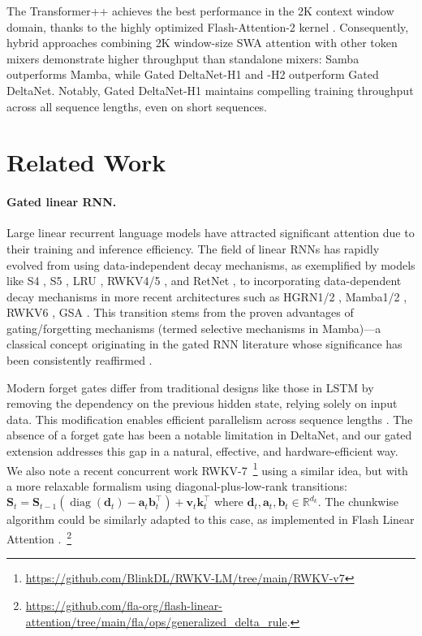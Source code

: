 \documentclass{article}
\def\rmS{{\mathbf{S}}}
\def\vk{{\bm{k}}}
\def\vv{{\bm{v}}}
\begin{document}
The Transformer++ achieves the best performance in the 2K context window domain, thanks to the highly optimized Flash-Attention-2 kernel \citep{flashattention2}. Consequently, hybrid approaches combining 2K window-size SWA attention with other token mixers demonstrate higher throughput than standalone mixers: Samba  outperforms Mamba, while Gated DeltaNet-H1 and -H2 
 outperform Gated DeltaNet. Notably, Gated DeltaNet-H1 maintains compelling training throughput across all sequence lengths, even on short sequences.

\section{Related Work} 
\paragraph{Gated linear RNN.} Large linear recurrent language models have attracted significant attention due to their training and inference efficiency. The field of linear RNNs has rapidly evolved from using data-independent decay mechanisms, as exemplified by models like S4 \citep{s4}, S5 \citep{s5}, LRU \citep{Orvieto2023ResurrectingRN}, 
 RWKV4/5 \citep{peng_rwkv_2023}, and RetNet \citep{sun2023retentive}, to incorporating data-dependent decay mechanisms in more recent architectures such as HGRN1/2 \citep{qin2024hgrn2, HGRN}, Mamba1/2 \citep{gu_mamba_2023,mamba2}, RWKV6 \citep{peng_eagle_2024}, GSA \citep{Zhang2024GatedSA}. This transition stems from the proven advantages of gating/forgetting mechanisms (termed selective mechanisms in Mamba)—a classical concept originating in the gated RNN literature \citep{DBLP:journals/neco/GersSC00} whose significance has been consistently reaffirmed \citep{Greff2015LSTMAS,unreasonable-forget-gate, qin2024hgrn2, HGRN, gu_mamba_2023}.

Modern forget gates differ from traditional designs like those in LSTM by removing the dependency on the previous hidden state, relying solely on input data. This modification enables efficient parallelism across sequence lengths \citep{parallel-martin,HGRN}. The absence of a forget gate has been a notable limitation in DeltaNet, and our gated extension addresses this gap in a natural, effective, and hardware-efficient way. We also note a recent concurrent work RWKV-7~\footnote{\url{https://github.com/BlinkDL/RWKV-LM/tree/main/RWKV-v7}} using a similar idea, but with a more relaxable formalism using diagonal-plus-low-rank transitions: $\rmS_t = \rmS_{t-1} (\operatorname{diag}(\mathbf{d}_t) - \mathbf{a}_t \mathbf{b}_t^\top) + \vv_t \vk_t^\top$ where $\mathbf{d}_t, \mathbf{a}_t, \mathbf{b}_t \in \mathbb{R}^{d_k}$. The chunkwise algorithm could be similarly adapted to this case, as implemented in Flash Linear Attention \citep{yang_fla_2024}.~\footnote{\url{https://github.com/fla-org/flash-linear-attention/tree/main/fla/ops/generalized_delta_rule}.}
\end{document}
